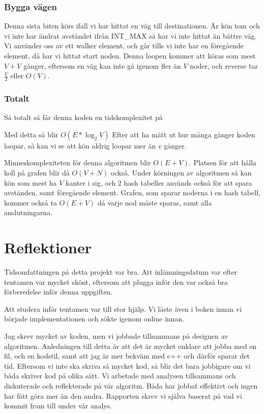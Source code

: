\documentclass[fleqn,10pt]{article}
\begin{document}
\subsubsection{Bygga vägen}
Denna sista biten körs ifall vi har hittat en väg till destinationen. Är kön tom och vi inte har ändrat avståndet ifrån INT\_MAX så har vi inte hittat än bättre väg. Vi använder oss av ett walker element, och går tills vi inte har en föregående element, då har vi hittat start noden. Denna loopen kommer att köras som mest $V+V$ gånger, eftersom en väg kan inte gå igenom fler än $V$ noder, och reverse tar $\frac{V}{2}$ eller $O(V)$.
\subsubsection{Totalt}
Så totalt så får denna koden en tidskomplexitet på

Med detta så blir $ O(E*\log_2{V})$
Efter att ha mätt ut hur många gånger koden loopar, så kan vi se att kön aldrig loopar mer än $v$ gånger. 

Minneskomplexiteten för denna algoritmen blir $O(E+V)$. Platsen för att hålla koll på grafen blir då $O(V+N)$ också. Under körningen av algoritmen så kan kön som mest ha $V$ kanter i sig, och 2 hash tabeller används också för att spara avstånden, samt föregående element. Grafen, som sparar noderna i en hash tabell, kommer också ta $O(E+V)$ då varje nod måste sparas, samt alla anslutningarna.
 
\section{Reflektioner}
Tidsomfattningen på detta projekt var bra. Att inlämningsdatum var efter tentamen var mycket skönt, eftersom att plugga inför den var också bra förberedelse inför denna uppgiften.

Att studera inför tentamen var till stor hjälp. Vi läste även i boken innan vi började implementationen och sökte igenom online innan.

Jag skrev mycket av koden, men vi jobbade tillsammans på designen av algoritmen. Anledningen till detta är att det är mycket enklare att jobba med en fil, och en kodstil, samt att jag är mer bekväm med c++ och därför sparar det tid. Eftersom vi inte ska skriva så mycket kod, så blir det bara jobbigare om vi båda skriver kod på olika sätt. Vi arbetade med analysen tillsammans och diskuterade och reflekterade på vår algoritm. Båda har jobbat effektivt och ingen har fått göra mer än den andra. Rapporten skrev vi själva baserat på vad vi kommit fram till under vår analys.
\end{document}
